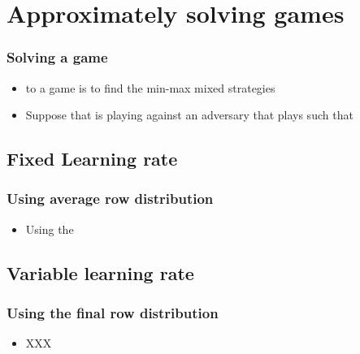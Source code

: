 \documentclass[handout]{beamer}
\begin{document}

\section{Approximately solving games}

\begin{frame}
  \frametitle{Solving a game}
  \begin{itemize}
    \item to  a game is to find the min-max mixed strategies
      \R{$\P,\Q$}
    \item Suppose that \ouralg is playing  against an
      adversary that plays  such that
  \end{itemize}
\end{frame}

\subsection{Fixed Learning rate}
\begin{frame}
\frametitle{Using average row distribution}
\begin{itemize}
\item Using the 
\end{itemize}
\end{frame}

\subsection{Variable learning rate}
\begin{frame}
\frametitle{Using the final row distribution}
\begin{itemize}
\item XXX
\end{itemize}
\end{frame}


\end{document}
